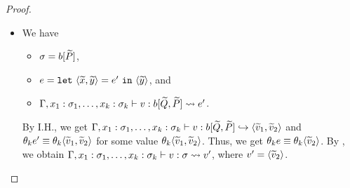 \begin{proof}
\begin{itemize}
\item[] 
We have
\begin{itemize}
\item \(\sigma=b[\widetilde{P}]\),
\item \(e=\mathtt{let~}\langle{\widetilde{x},\widetilde{y}}\rangle=e'\mathtt{~in~}{\langle{\widetilde{y}}\rangle}\), and
\item \(\Gamma,x_1:\sigma_1,\dots,x_k:\sigma_k \vdash v : b[\widetilde{Q},\widetilde{P}] \leadsto e'\).
\end{itemize}
By I.H., we get \(\Gamma,x_1:\sigma_1,\dots,x_k:\sigma_k \vdash v : b[\widetilde{Q},\widetilde{P}] \hookrightarrow \langle{\widetilde{v}_1,\widetilde{v}_2}\rangle\) and
\(\theta_k e' \equiv \theta_k \langle{\widetilde{v}_1,\widetilde{v}_2}\rangle\) for some value \(\theta_k \langle{\widetilde{v}_1,\widetilde{v}_2}\rangle\).
Thus, we get \(\theta_k e \equiv \theta_k \langle{\widetilde{v}_2}\rangle\).
By , we obtain
\(\Gamma,x_1:\sigma_1,\dots,x_k:\sigma_k \vdash v : \sigma \leadsto v'\), where
\(v'=\langle{\widetilde{v}_2}\rangle\).


\end{itemize}
\end{proof}
